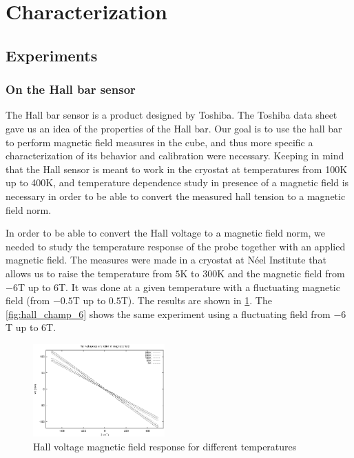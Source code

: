 \documentclass[journal]{IEEEtran}
\begin{document}
\section{Characterization}

\subsection{Experiments}


\subsubsection{On the Hall bar sensor}
The Hall bar sensor is a product designed by Toshiba. The Toshiba data sheet \cite{toshiba} gave us an idea of the properties of the Hall bar. Our goal is to use the hall bar to perform magnetic field measures in the cube, and thus more specific a characterization of its behavior and calibration were necessary. Keeping in mind that the Hall sensor is meant to work in the cryostat at temperatures from 100K up to 400K, and temperature dependence study  in presence of a magnetic field is necessary in order to be able to convert the measured hall tension to a magnetic field norm.

In order to be able to convert the Hall voltage to a magnetic field norm, we needed to study the temperature response of the probe together with an applied magnetic field. The measures were made in a cryostat at Néel Institute that allows us to raise the temperature from $5$K to $300$K and the magnetic field from $-6$T up to $6$T. It was done at a given temperature with a fluctuating magnetic field (from $-0.5$T up to $0.5$T). The results are shown in \figurename \ref{fig:hall_champ}. The \figurename \ref{fig:hall_champ_6} shows the same experiment using a fluctuating field from $-6$T up to $6$T.

\begin{figure}[h]
\centering
\includegraphics[width=0.45\textwidth]{tension_hall_fonction_champ.eps}
\caption{Hall voltage magnetic field response for different temperatures}
\label{fig:hall_champ}
\end{figure}
\end{document}
